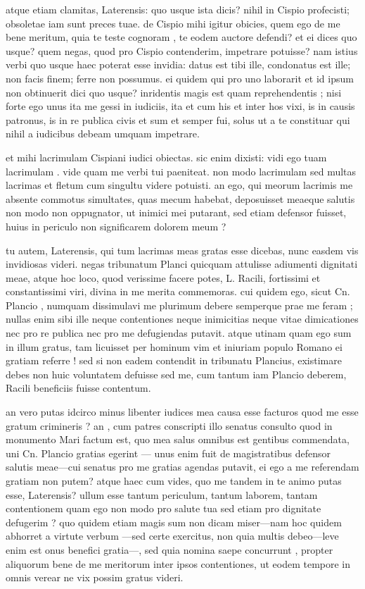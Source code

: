  atque etiam clamitas, Laterensis: quo usque ista dicis? nihil in Cispio profecisti; obsoletae iam sunt preces tuae. de Cispio mihi igitur obicies, quem ego de me bene meritum, quia te teste cognoram , te eodem auctore defendi? et ei dices quo usque? quem negas, quod pro Cispio contenderim, impetrare potuisse? nam istius verbi quo usque haec poterat esse invidia: datus est tibi ille, condonatus est ille; non facis finem; ferre non possumus. ei quidem qui pro uno laborarit et id ipsum non obtinuerit dici quo usque? inridentis magis est quam reprehendentis ; nisi forte ego unus ita me gessi in iudiciis, ita et cum his et inter hos vixi, is in causis patronus, is in re publica civis et sum et semper fui, solus ut a te constituar qui nihil a iudicibus debeam umquam impetrare.

 et mihi lacrimulam Cispiani iudici obiectas. sic enim dixisti: vidi ego tuam lacrimulam . vide quam me verbi tui paeniteat. non modo lacrimulam sed multas lacrimas et fletum cum singultu videre potuisti. an ego, qui meorum lacrimis me absente commotus simultates, quas mecum habebat, deposuisset meaeque salutis non modo non oppugnator, ut inimici mei putarant, sed etiam defensor fuisset, huius in periculo non significarem dolorem meum ?

 tu autem, Laterensis, qui tum lacrimas meas gratas esse dicebas, nunc easdem vis invidiosas videri. negas tribunatum Planci quicquam attulisse adiumenti dignitati meae, atque hoc loco, quod verissime facere potes, L. Racili, fortissimi et constantissimi viri, divina in me merita commemoras. cui quidem ego, sicut Cn. Plancio , numquam dissimulavi me plurimum debere semperque prae me feram ; nullas enim sibi ille neque contentiones neque inimicitias neque vitae dimicationes nec pro re publica nec pro me defugiendas putavit. atque utinam quam ego sum in illum gratus, tam licuisset per hominum vim et iniuriam populo Romano ei gratiam referre ! sed si non eadem contendit in tribunatu Plancius, existimare debes non huic voluntatem defuisse sed me, cum tantum iam Plancio deberem, Racili beneficiis fuisse contentum.

 an vero putas idcirco minus libenter iudices mea causa esse facturos quod me esse gratum crimineris ? an , cum patres conscripti illo senatus consulto quod in monumento Mari factum est, quo mea salus omnibus est gentibus commendata, uni Cn. Plancio gratias egerint — unus enim fuit de magistratibus defensor salutis meae—cui senatus pro me gratias agendas putavit, ei ego a me referendam gratiam non putem? atque haec cum vides, quo me tandem in te animo putas esse, Laterensis? ullum esse tantum periculum, tantum laborem, tantam contentionem quam ego non modo pro salute tua sed etiam pro dignitate defugerim ? quo quidem etiam magis sum non dicam miser—nam hoc quidem abhorret a virtute verbum —sed certe exercitus, non quia multis debeo—leve enim est onus benefici gratia—, sed quia nomina saepe concurrunt , propter aliquorum bene de me meritorum inter ipsos contentiones, ut eodem tempore in omnis verear ne vix possim gratus videri.

